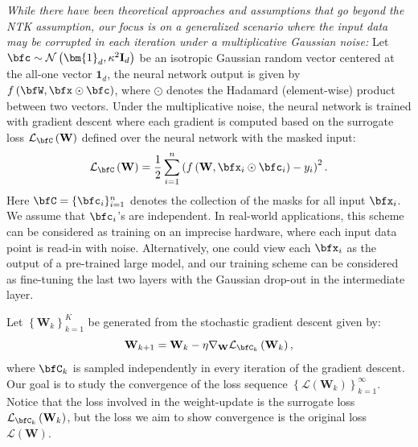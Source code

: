 \documentclass[10pt]{article} %
\theoremstyle{definition}
\theoremstyle{plain}
\newcommand{\paren}[1]{\left(#1\right)}
\def\calL{{\mathcal{L}}}
\def\bfI{{\mathbf{I}}}\def\bfJ{{\mathbf{J}}}\def\bfK{{\mathbf{K}}}\def\bfL{{\mathbf{L}}}
\begin{document}
\textit{While there have been theoretical approaches and assumptions that go beyond the NTK assumption, our focus is on a generalized scenario where the input data may be corrupted in each iteration under a multiplicative Gaussian noise:} 
Let $\bfc\sim\mathcal{N}\paren{\bm{1}_d,\kappa^2\bfI_d}$ be an isotropic Gaussian random vector centered at the all-one vector $\bm{1}_d$, the neural network output is given by $f\paren{\bfW,\bfx\odot\bfc}$, 
where $\odot$ denotes the Hadamard (element-wise) product between two vectors. 
Under the multiplicative noise, the neural network is trained with gradient descent where each gradient is computed based on the surrogate loss $\calL_{\bfC}\paren{\mathbf{W}}$ defined over the neural network with the masked input:
\[
    \calL_{\bfC}\paren{\mathbf{W}} = \frac{1}{2}\sum_{i=1}^n\paren{f\paren{\mathbf{W},\bfx_i\odot\bfc_i}- y_i}^2.
\]
Here $\bfC = \{\bfc_i\}_{i=1}^n$ denotes the collection of the masks for all input $\bfx_i$. 
We assume that $\bfc_i$'s are independent. 
In real-world applications, this scheme can be considered as training on an imprecise hardware, where each input data point is read-in with noise. Alternatively, one could view each $\bfx_i$ as the output of a pre-trained large model, and our training scheme can be considered as fine-tuning the last two layers with the Gaussian drop-out \citep{wang2013fast,kingma2015variational,rey2021gaussian} in the intermediate layer. 

Let $\left\{\mathbf{W}_k\right\}_{k=1}^K$ be generated from the stochastic gradient descent given by:
\begin{equation}
    \label{eq:gaussin_input_mask_gd}
    \mathbf{W}_{k+1} = \mathbf{W}_k - \eta\nabla_{\mathbf{W}}\calL_{\bfC_k}\paren{\mathbf{W}_k},
\end{equation}
where $\bfC_k$ is sampled independently in every iteration of the gradient descent.
Our goal is to study the convergence of the loss sequence $\left\{\calL\paren{\mathbf{W}_k}\right\}_{k=1}^\infty$. 
Notice that the loss involved in the weight-update is the surrogate loss $\calL_{\bfC_k}\paren{\mathbf{W}_k}$, but the loss we aim to show convergence is the original loss $\calL\paren{\mathbf{W}}$. 
\end{document}
